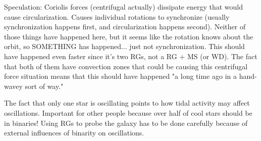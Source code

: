 Speculation:
Coriolis forces (centrifugal actually) dissipate energy that would cause circularization. Causes individual rotations to synchronize (usually synchronization happens first, and circularization happens second). Neither of those things have happened here, but it seems like the rotation knows about the orbit, so SOMETHING has happened... just not synchronization. This should have happened even faster since it's two RGs, not a RG + MS (or WD). The fact that both of them have convection zones that could be causing this centrifugal force situation means that this should have happened "a long time ago in a hand-wavey sort of way."

The fact that only one star is oscillating points to how tidal activity may affect oscillations.
Important for other people because over half of cool stars should be in binaries! Using RGs to probe the galaxy has to be done carefully because of external influences of binarity on oscillations.
    
    
    
    